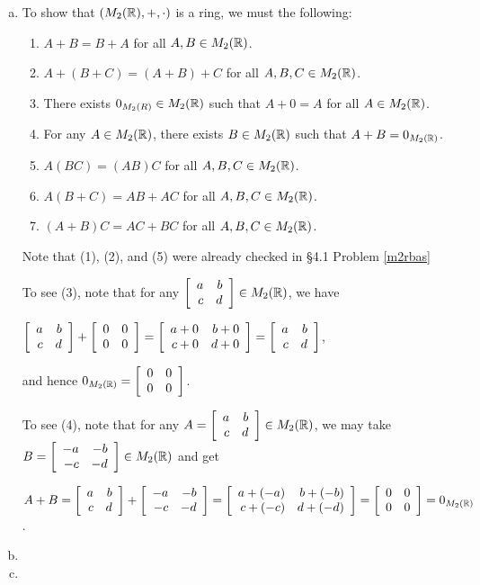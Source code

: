 \documentclass[11pt,fleqn,dvipsnames,usenames]{article}
\begin{document}
\begin{enumerate}[1.]
\solution 
\begin{enumerate}[(a)]
\item To show that $(M_{2}(\R), +, \cdot)$ is a ring, we must the following:
\begin{enumerate}[(1)]
\item $A + B  = B + A$ for all $A,B\in M_{2}(\R)$.
\item $A + (B + C) = (A + B) + C$ for all $A,B,C \in M_{2}(\R)$.
\item There exists $0_{M_{2}(R)}\in M_{2}(\R)$ such that $A + 0 = A$ for all $A\in M_{2}(\R)$.
\item For any $A\in M_{2}(\R)$, there exists $B\in M_{2}(\R)$ such that $A + B = 0_{M_{2}(\R)}$.
\item $A(BC) = (AB)C$ for all $A,B,C \in M_{2}(\R)$.
\item $A(B+C) = AB + AC$ for all $A,B,C \in M_{2}(\R)$.
\item $(A +B)C = AC + BC$ for all $A,B,C \in M_{2}(\R)$.
\end{enumerate}
Note that (1), (2), and (5) were already checked in \S4.1 Problem \ref{m2rbas}
\vsmsp

To see (3), note that for any $\MATRIX{rr}{a & b\\c & d}\in M_{2}(\R)$, we have
\begin{center}
$\MATRIX{rr}{a & b\\c & d} + \MATRIX{rr}{0 & 0\\0 & 0} = \MATRIX{rr}{a + 0 & b + 0\\c + 0 & d + 0} = \MATRIX{rr}{a & b\\c & d}$,
\end{center}
and hence $0_{M_{2}(\R)} = \MATRIX{rr}{0 & 0\\0 & 0}$.

To see (4), note that for any $A = \MATRIX{rr}{a & b\\c & d}\in M_{2}(\R)$, we may take $B = \MATRIX{rr}{-a & -b\\-c & -d}\in M_{2}(\R)$ and get
\begin{center}
$A + B = \MATRIX{rr}{a & b\\c & d} + \MATRIX{rr}{-a & -b\\-c & -d} = \MATRIX{rr}{a + (-a) & b + (-b)\\c + (-c) & d + (-d)} = \MATRIX{rr}{0 & 0\\0 & 0} = 0_{M_{2}(\R)}$.
\end{center}
\item 
 
\item 


\end{enumerate}
\end{enumerate}
\end{document}
